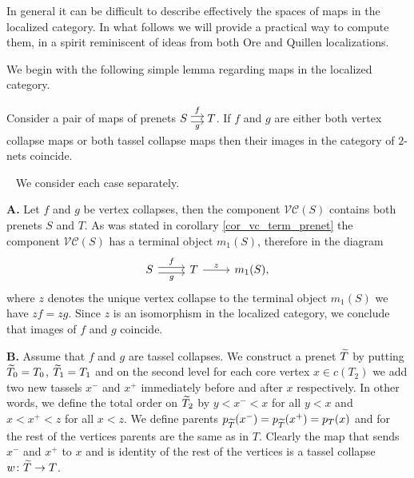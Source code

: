 \documentclass[letterpaper,12pt,leqno]{article}
\numberwithin{equation}{theorem}
\def\proof{\noindent{\em Proof:}\ }
\begin{document}
In general it can be difficult to describe effectively the spaces of maps in the localized category. In what follows we will provide a practical way to compute them,
in a spirit reminiscent of ideas from both Ore and Quillen localizations.

We begin with the following simple lemma regarding maps in the localized category.

\begin{lemma}
\label{lemma_vc_tc_pair}
Consider a pair of maps of prenets $\begin{tikzcd}[cramped,sep=small]S \ar[shift left, r, "f"] \ar[shift right, r, "g"'] & T\end{tikzcd}$.
If $f$ and $g$ are either both vertex collapse maps or both tassel collapse maps then their images in the category of $2$-nets coincide.
\end{lemma}
\proof
We consider each case separately.

{\bf A.} Let $f$ and $g$ be vertex collapses, then the component $\mathcal{VC}(S)$ contains both prenets $S$ and $T$. As was stated in corollary \ref{cor_vc_term_prenet}
the component $\mathcal{VC}(S)$ has a terminal object $m_1(S)$, therefore in the diagram
$$
\begin{tikzcd}
S \ar[shift left, r, "f"] \ar[shift right, r, "g"'] & T \ar[r, "z"] & m_1(S),
\end{tikzcd}
$$
where $z$ denotes the unique vertex collapse to the terminal object $m_1(S)$ we have $zf = zg$. Since $z$ is an isomorphism in the localized category, we conclude that
images of $f$ and $g$ coincide.

{\bf B.} Assume that $f$ and $g$ are tassel collapses. We construct a prenet $\widetilde T$ by putting $\widetilde T_0 = T_0$, $\widetilde T_1 = T_1$ and on the second level
for each core vertex $x \in c(T_2)$ we add two new tassels $x^-$ and $x^+$ immediately before and after $x$ respectively. In other words, we define the total order
on $\widetilde T_2$ by $y < x^- < x$ for all $y < x$ and $x < x^+ < z$ for all $x < z$. We define parents $p_{\widetilde T}(x^-) = p_{\widetilde T}(x^+) = p_T(x)$ and
for the rest of the vertices parents are the same as in $T$. Clearly the map that sends $x^-$ and $x^+$ to $x$ and is identity of the rest of the vertices is
a tassel collapse $w\colon \widetilde T \to T$.
\end{document}
